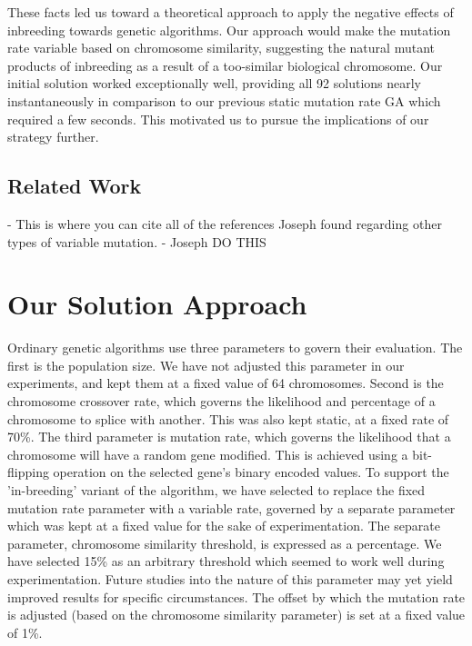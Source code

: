\documentclass{sig-alternate}
\begin{document}
These facts led us toward a theoretical approach to apply the negative effects of inbreeding towards genetic algorithms. Our approach would make the mutation rate variable based on chromosome similarity, suggesting the natural mutant products of inbreeding as a result of a too-similar biological chromosome. Our initial solution worked exceptionally well, providing all 92 solutions nearly instantaneously in comparison to our previous static mutation rate GA which required a few seconds. This motivated us to pursue the implications of our strategy further.

\subsection{Related Work}

- This is where you can cite all of the references Joseph found regarding other types of variable mutation.
- Joseph DO THIS




% 
%
\section{Our Solution Approach}\label{params}
Ordinary genetic algorithms use three parameters to govern their evaluation. The first is the population size. We have not adjusted this parameter in our experiments, and kept them at a fixed value of 64 chromosomes. Second is the chromosome crossover rate, which governs the likelihood and percentage of a chromosome to splice with another. This was also kept static, at a fixed rate of 70\%. The third parameter is mutation rate, which governs the likelihood that a chromosome will have a random gene modified. This is achieved using a bit-flipping operation on the selected gene's binary encoded values. To support the 'in-breeding' variant of the algorithm, we have selected to replace the fixed mutation rate parameter with a variable rate, governed by a separate parameter which was kept at a fixed value for the sake of experimentation. The separate parameter, chromosome similarity threshold, is expressed as a percentage. We have selected 15\% as an arbitrary threshold which seemed to work well during experimentation. Future studies into the nature of this parameter may yet yield improved results for specific circumstances. The offset by which the mutation rate is adjusted (based on the chromosome similarity parameter) is set at a fixed value of 1\%.
\end{document}
